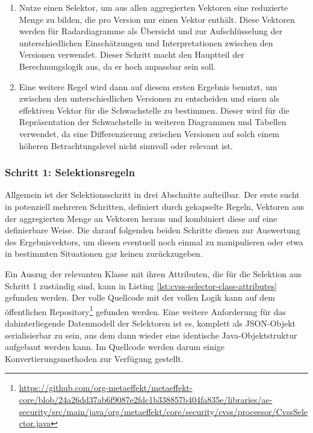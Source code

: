 \begin{enumerate}
    \item
    Nutze einen Selektor, um aus allen aggregierten Vektoren eine reduzierte Menge zu bilden, die pro Version nur einen Vektor enthält.
    Diese Vektoren werden für Radardiagramme als Übersicht und zur Aufschlüsselung der unterschiedlichen Einschätzungen und Interpretationen zwischen den Versionen verwendet.
    Dieser Schritt macht den Hauptteil der Berechnungslogik aus, da er hoch anpassbar sein soll.
    \item
    Eine weitere Regel wird dann auf diesem ersten Ergebnis benutzt, um zwischen den unterschiedlichen Versionen zu entscheiden und einen als effektiven Vektor für die Schwachstelle zu bestimmen.
    Dieser wird für die Repräsentation der Schwachstelle in weiteren Diagrammen und Tabellen verwendet, da eine Differenzierung zwischen Versionen auf solch einem höheren Betrachtungslevel nicht sinnvoll oder relevant ist.
\end{enumerate}

\subsubsection{Schritt 1: Selektionsregeln} \label{subsubsec:projektbericht-loesungsweg-cvss-selection-rules-1}

Allgemein ist der Selektionsschritt in drei Abschnitte aufteilbar.
Der erste sucht in potenziell mehreren Schritten, definiert durch gekapselte Regeln, Vektoren aus der aggregierten Menge an Vektoren heraus und kombiniert diese auf eine definierbare Weise.
Die darauf folgenden beiden Schritte dienen zur Auswertung des Ergebnisvektors, um diesen eventuell noch einmal zu manipulieren oder etwa in bestimmten Situationen gar keinen zurückzugeben.

Ein Auszug der relevanten Klasse mit ihren Attributen, die für die Selektion aus Schritt 1 zuständig sind, kann in Listing \ref{lst:cvss-selector-class-attributes} gefunden werden.
Der volle Quellcode mit der vollen Logik kann auf dem öffentlichen Repository\footnote{\url{https://github.com/org-metaeffekt/metaeffekt-core/blob/24a26dd37ab6f9087e2fdc1b338857b404fa835e/libraries/ae-security/src/main/java/org/metaeffekt/core/security/cvss/processor/CvssSelector.java}} gefunden werden.
Eine weitere Anforderung für das dahinterliegende Datenmodell der Selektoren ist es, komplett als JSON-Objekt serialisierbar zu sein, aus dem dann wieder eine identische Java-Objektstruktur aufgebaut werden kann.
Im Quellcode werden darum einige Konvertierungsmethoden zur Verfügung gestellt.

